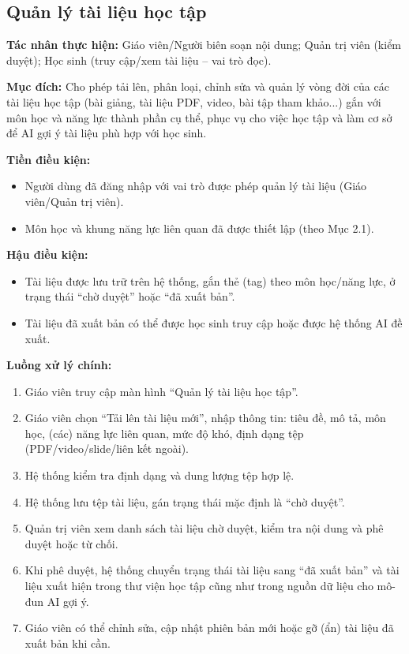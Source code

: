 \documentclass[12pt,a4paper]{article}
\newcommand{\ucfield}[2]{\noindent\textbf{#1: } #2\par\vspace{0.35em}}
\begin{document}
	\subsection{Quản lý tài liệu học tập}
	
	\ucfield{Tác nhân thực hiện}{Giáo viên/Người biên soạn nội dung; Quản trị viên (kiểm duyệt); Học sinh (truy cập/xem tài liệu -- vai trò đọc).}
	
	\ucfield{Mục đích}{Cho phép tải lên, phân loại, chỉnh sửa và quản lý vòng đời của các tài liệu học tập (bài giảng, tài liệu PDF, video, bài tập tham khảo...) gắn với môn học và năng lực thành phần cụ thể, phục vụ cho việc học tập và làm cơ sở để AI gợi ý tài liệu phù hợp với học sinh.}
	
	\ucfield{Tiền điều kiện}{
		\begin{itemize}[nosep]
			\item Người dùng đã đăng nhập với vai trò được phép quản lý tài liệu (Giáo viên/Quản trị viên).
			\item Môn học và khung năng lực liên quan đã được thiết lập (theo Mục 2.1).
	\end{itemize}}
	
	\ucfield{Hậu điều kiện}{
		\begin{itemize}[nosep]
			\item Tài liệu được lưu trữ trên hệ thống, gắn thẻ (tag) theo môn học/năng lực, ở trạng thái ``chờ duyệt'' hoặc ``đã xuất bản''.
			\item Tài liệu đã xuất bản có thể được học sinh truy cập hoặc được hệ thống AI đề xuất.
	\end{itemize}}
	
	\ucfield{Luồng xử lý chính}{
		\begin{enumerate}[nosep]
			\item Giáo viên truy cập màn hình ``Quản lý tài liệu học tập''.
			\item Giáo viên chọn ``Tải lên tài liệu mới'', nhập thông tin: tiêu đề, mô tả, môn học, (các) năng lực liên quan, mức độ khó, định dạng tệp (PDF/video/slide/liên kết ngoài).
			\item Hệ thống kiểm tra định dạng và dung lượng tệp hợp lệ.
			\item Hệ thống lưu tệp tài liệu, gán trạng thái mặc định là ``chờ duyệt''.
			\item Quản trị viên xem danh sách tài liệu chờ duyệt, kiểm tra nội dung và phê duyệt hoặc từ chối.
			\item Khi phê duyệt, hệ thống chuyển trạng thái tài liệu sang ``đã xuất bản'' và tài liệu xuất hiện trong thư viện học tập cũng như trong nguồn dữ liệu cho mô-đun AI gợi ý.
			\item Giáo viên có thể chỉnh sửa, cập nhật phiên bản mới hoặc gỡ (ẩn) tài liệu đã xuất bản khi cần.
	\end{enumerate}}
	
\end{document}

